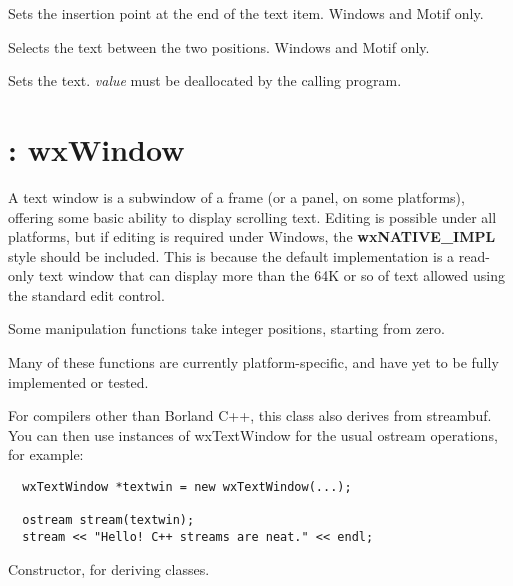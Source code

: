 

Sets the insertion point at the end of the text item. Windows and Motif only.



Selects the text between the two positions. Windows and Motif only.



Sets the text. {\it value} must be deallocated by the calling program.

\section{: wxWindow}\label{wxtextwindow}

A text window is a subwindow of a frame (or a panel, on some platforms),
offering some basic ability to display scrolling text. Editing is
possible under all platforms, but if editing is required under Windows,
the {\bf wxNATIVE\_IMPL} style should be included. This is because the
default implementation is a read-only text window that can display more
than the 64K or so of text allowed using the standard edit control.

Some manipulation functions take integer positions, starting from zero.

Many of these functions are currently platform-specific, and have yet
to be fully implemented or tested.

For compilers other than Borland C++, this class
also derives from streambuf. You can then use instances of wxTextWindow
for the usual ostream operations, for example:

\begin{verbatim}
  wxTextWindow *textwin = new wxTextWindow(...);

  ostream stream(textwin);
  stream << "Hello! C++ streams are neat." << endl;
\end{verbatim}

\label{constrtextwindow}


Constructor, for deriving classes.

